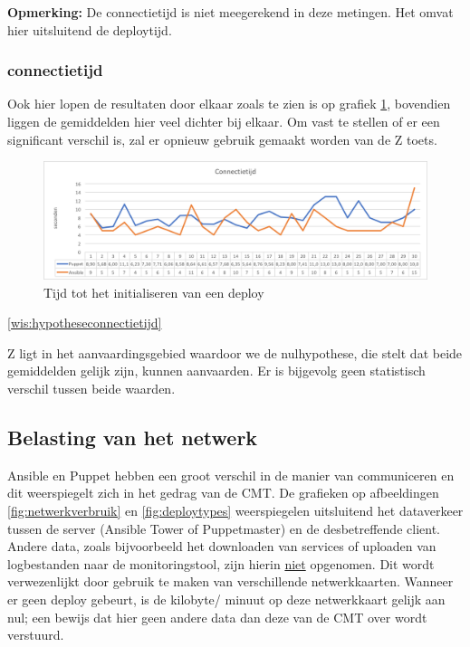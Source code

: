 \textbf{Opmerking:} De \gls{connectietijd} is niet meegerekend in deze metingen. Het omvat hier uitsluitend de \gls{deploytijd}.
\subsubsection{\gls{connectietijd}}
Ook hier lopen de resultaten door elkaar zoals te zien is op grafiek \ref{fig:connectiontime}, bovendien liggen de gemiddelden hier veel dichter bij elkaar. Om vast te stellen of er een significant verschil is, zal er opnieuw gebruik gemaakt worden van de Z toets.
\begin{figure}
  \includegraphics[width=\linewidth]{img/connectiontime.png} 
  \caption{Tijd tot het initialiseren van een deploy}  
  \label{fig:connectiontime}
\end{figure}



\ref{wis:hypotheseconnectietijd}

Z ligt in het aanvaardingsgebied waardoor we de nulhypothese, die stelt dat beide gemiddelden gelijk zijn, kunnen aanvaarden. Er is bijgevolg geen statistisch verschil tussen beide waarden.

\subsection{Belasting van het netwerk}

Ansible en Puppet hebben een groot verschil in de manier van communiceren en dit weerspiegelt zich in het gedrag van de \gls{CMT}. De grafieken op afbeeldingen \ref{fig:netwerkverbruik} en \ref{fig:deploytypes} weerspiegelen uitsluitend het dataverkeer tussen de server (Ansible Tower of Puppetmaster) en de desbetreffende client. Andere data, zoals bijvoorbeeld het downloaden van services of uploaden van logbestanden naar de monitoringstool, zijn hierin \underline{niet} opgenomen. Dit wordt verwezenlijkt door gebruik te maken van verschillende netwerkkaarten. Wanneer er geen deploy gebeurt, is de kilobyte/ minuut op deze netwerkkaart gelijk aan nul; een bewijs dat hier geen andere data dan deze van de \gls{CMT} over wordt verstuurd.  \newline

